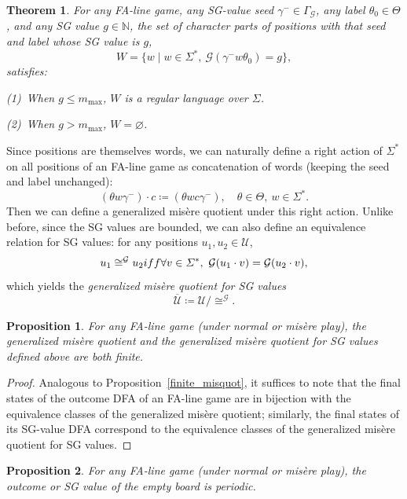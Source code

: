 \documentclass[11pt]{article}
\newtheorem{theorem}{Theorem}[section]
\newtheorem{proposition}{Proposition}[section]
\theoremstyle{definition}
\theoremstyle{plain}
\newcommand{\varG}{\mathcal{G}}
\newcommand{\varU}{\mathcal{U}}
\begin{document}
\begin{theorem}\label{line_sg_dfa}
    For any FA-line game, any SG-value seed $\gamma^-\in\varGamma_{\varG}$, any label $\theta_0 \in\varTheta$,
    and any SG value $g\in\mathbb{N}$, the set of character parts of positions with that seed and label whose SG value is $g$,
    \[
        W = \{w \mid w\in\varSigma^*,\ \varG(\gamma^- w\theta_0)=g\},
    \]
    satisfies:

    (1)~When $g \leq m_{\max}$, $W$ is a regular language over $\varSigma$.

    (2)~When $g > m_{\max}$, $W=\varnothing$.
\end{theorem}

Since positions are themselves words, we can naturally define a right action of $\varSigma^*$ on all positions of an FA-line game as concatenation of words (keeping the seed and label unchanged):
\[
    (\theta w \gamma^-) \cdot c \coloneq (\theta wc \gamma^-),\quad \theta\in\varTheta,\ w\in\varSigma^*.
\]
Then we can define a generalized misère quotient under this right action.
Unlike before, since the SG values are bounded, we can also define an equivalence relation for SG values:
for any positions $u_1, u_2\in\varU$,
\[
    u_1 \cong^{\varG} u_2 \\iff \forall v\in\varSigma^*,\ \varG(u_1\cdot v) = \varG(u_2\cdot v),
\]
which yields the \textit{generalized misère quotient for SG values}
\[
    \overline{\varU} \coloneq \varU / \cong^{\varG}.
\]

\begin{proposition}\label{line_finite_misquot}
    For any FA-line game (under normal or misère play), the generalized misère quotient and the generalized misère quotient for SG values defined above are both finite.
\end{proposition}

\begin{proof}
    Analogous to Proposition~\ref{finite_misquot}, it suffices to note that the final states of the outcome DFA of an FA-line game are in bijection with the equivalence classes of the generalized misère quotient;
    similarly, the final states of its SG-value DFA correspond to the equivalence classes of the generalized misère quotient for SG values.
\end{proof}

\begin{proposition}
    For any FA-line game (under normal or misère play), the outcome or SG value of the empty board is periodic.
\end{proposition}
\end{document}
